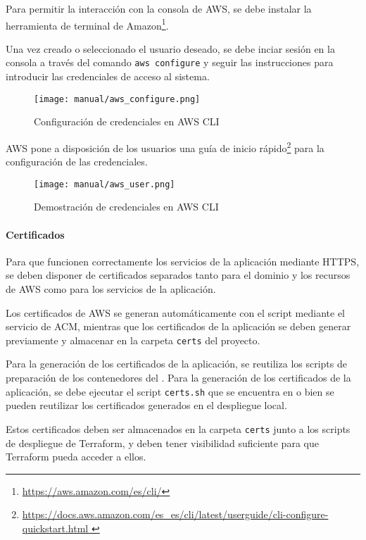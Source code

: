 Para permitir la interacción con la consola de AWS, se debe instalar la
herramienta de terminal de Amazon\footnote{\url{https://aws.amazon.com/es/cli/}}.

Una vez creado o seleccionado el usuario deseado, se debe inciar sesión en la
consola a través del comando \texttt{aws configure} y seguir las instrucciones
para introducir las credenciales de acceso al sistema.

\begin{figure}[H]
	\centering
	\texttt{[image: manual/aws\_configure.png]}
	\caption{Configuración de credenciales en AWS CLI}
	\label{fig:aws_configure}
\end{figure}

AWS pone a disposición de los usuarios una guía de inicio rápido\footnote{\url{
	https://docs.aws.amazon.com/es_es/cli/latest/userguide/cli-configure-quickstart.html
}} para la configuración de las credenciales.

\begin{figure}[H]
	\centering
	\texttt{[image: manual/aws\_user.png]}
	\caption{Demostración de credenciales en AWS CLI}
	\label{fig:aws_user}
\end{figure}


\newpage{}
\paragraph{Certificados}
Para que funcionen correctamente los servicios de la aplicación mediante HTTPS,
se deben disponer de certificados separados tanto para el dominio y los
recursos de AWS como para los servicios de la aplicación.

Los certificados de AWS se generan automáticamente con el script mediante el
servicio de ACM, mientras que los certificados de la aplicación se deben
generar previamente y almacenar en la carpeta \texttt{certs} del proyecto.

Para la generación de los certificados de la aplicación, se reutiliza los
scripts de preparación de los contenedores del .
Para la generación de los certificados de la aplicación, se debe ejecutar
el script \texttt{certs.sh} que se encuentra en  o
bien se pueden reutilizar los certificados generados en el despliegue local.

Estos certificados deben ser almacenados en la carpeta \texttt{certs} junto a
los scripts de despliegue de Terraform, y deben tener visibilidad suficiente
para que Terraform pueda acceder a ellos.


